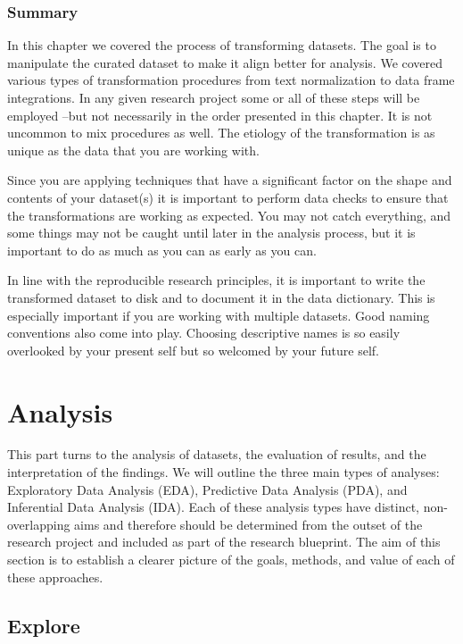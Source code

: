 \documentclass[
  letterpaper,
  krantz1]{latex/krantz-mod}
\theoremstyle{definition}
\theoremstyle{definition}
\theoremstyle{remark}
\begin{document}
\section*{Summary}\label{summary-6}


In this chapter we covered the process of transforming datasets. The
goal is to manipulate the curated dataset to make it align better for
analysis. We covered various types of transformation procedures from
text normalization to data frame integrations. In any given research
project some or all of these steps will be employed --but not
necessarily in the order presented in this chapter. It is not uncommon
to mix procedures as well. The etiology of the transformation is as
unique as the data that you are working with.

Since you are applying techniques that have a significant factor on the
shape and contents of your dataset(s) it is important to perform data
checks to ensure that the transformations are working as expected. You
may not catch everything, and some things may not be caught until later
in the analysis process, but it is important to do as much as you can as
early as you can.

In line with the reproducible research principles, it is important to
write the transformed dataset to disk and to document it in the data
dictionary. This is especially important if you are working with
multiple datasets. Good naming conventions also come into play. Choosing
descriptive names is so easily overlooked by your present self but so
welcomed by your future self.

\part{Analysis}

This part turns to the analysis of datasets, the evaluation of results,
and the interpretation of the findings. We will outline the three main
types of analyses: Exploratory Data Analysis (EDA), Predictive Data
Analysis (PDA), and Inferential Data Analysis (IDA). Each of these
analysis types have distinct, non-overlapping aims and therefore should
be determined from the outset of the research project and included as
part of the research blueprint. The aim of this section is to establish
a clearer picture of the goals, methods, and value of each of these
approaches.

\chapter{Explore}\label{sec-explore-chapter}
\end{document}
